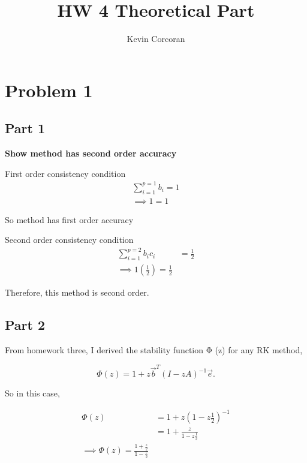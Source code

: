 \documentclass{article}
\title{HW 4 Theoretical Part}
\author{Kevin Corcoran}
\begin{document}
\maketitle

\section{Problem 1}%
\label{sec:problem_1}

\subsection{Part 1}%
\label{sub:part_1}

\textbf{Show method has second order accuracy} 

\par First order consistency condition 
\begin{align*}
  \sum^{p=1}_{i=1} b_i = 1 \\
  \implies 1 = 1
\end{align*}

So method has first order accuracy

\vspace{15px}
\par Second order consistency condition
\begin{align*}
  \sum^{p=2}_{i=1} b_i c_i &= \frac{1}{2} \\
  \implies 1(\frac{1}{2}) = \frac{1}{2}
\end{align*}

Therefore, this method is second order.

\subsection{Part 2}%
\label{sub:part_2}

\par From homework three, I derived the stability function  Φ (z)  for any RK
method,

\[
\Phi (z) = 1 +z \vec{b}^{T}  (I-zA)^{-1}   \vec{e}
.\] 

\par So in this case,

\begin{align*}
  \Phi (z) &= 1 + z (1-z\frac{1}{2})^{-1} \\
           &= 1 + \frac{z}{1-z \frac{1}{2}} \\
           \implies \boxed{\Phi (z) = \frac{ 1 + \frac{z}{2} }{1 - \frac{z}{2}}}
\end{align*}
\end{document}
